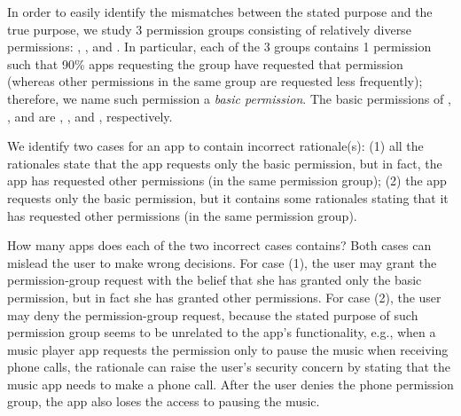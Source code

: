 In order to easily identify the mismatches between the stated purpose and the true purpose, we study 3 permission groups consisting of relatively diverse permissions: , , and . 
In particular, each of the 3 groups contains 1 permission such that 90\% apps requesting the group have requested that permission (whereas other permissions in the same group are requested less frequently);  therefore, we name such permission a \emph{basic permission}. 
The basic permissions of , , and  are , , and , respectively. 

\begin{mydef}
We identify two cases for an app to contain incorrect rationale(s): 
(1) all the rationales state that the app requests only the basic permission, but in fact, the app has requested other permissions (in the same permission group); 
(2) the app requests only the basic permission, but it contains some rationales stating that it has requested other permissions (in the same permission group). 
\end{mydef}

How many apps does each of the two incorrect cases contains? Both cases can mislead the user to make wrong decisions. 
For case (1), the user may grant the permission-group request with the belief that she has granted only the basic permission, but in fact she has granted other permissions. 
For case (2), the user may deny the permission-group request, because the stated purpose of such permission group seems to be unrelated to the app's functionality, 
e.g., when a music player app requests the  permission only to pause the music when receiving phone calls, 
the rationale can raise the user's security concern by stating that the music app needs to make a phone call. 
After the user denies the phone permission group, the app also loses the access to pausing the music. 

